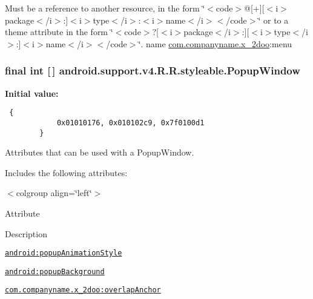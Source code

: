 Must be a reference to another resource, in the form \char`\"{}$<$code$>$@\mbox{[}+\mbox{]}\mbox{[}$<$i$>$package$<$/i$>$:\mbox{]}$<$i$>$type$<$/i$>$:$<$i$>$name$<$/i$>$$<$/code$>$\char`\"{} or to a theme attribute in the form \char`\"{}$<$code$>$?\mbox{[}$<$i$>$package$<$/i$>$:\mbox{]}\mbox{[}$<$i$>$type$<$/i$>$:\mbox{]}$<$i$>$name$<$/i$>$$<$/code$>$\char`\"{}.  name \hyperlink{namespacecom_1_1companyname_1_1x__2doo}{com.companyname.x\_\-2doo}:menu \hypertarget{classandroid_1_1support_1_1v4_1_1_r_1_1styleable_f2e6c1d44ab2f0d74ae025658a5ce5c3}{
\subsubsection[{PopupWindow}]{\setlength{\rightskip}{0pt plus 5cm}final int \mbox{[}$\,$\mbox{]} android.support.v4.R.R.styleable.PopupWindow}}
\label{classandroid_1_1support_1_1v4_1_1_r_1_1styleable_f2e6c1d44ab2f0d74ae025658a5ce5c3}


\textbf{Initial value:}

\begin{Code}\begin{verbatim} {
            0x01010176, 0x010102c9, 0x7f0100d1
        }
\end{verbatim}
\end{Code}
Attributes that can be used with a PopupWindow. 

Includes the following attributes: \begin{TabularC}{0}
\hline
\end{TabularC}
$<$colgroup align=\char`\"{}left\char`\"{}$>$ 

Attribute

Description 

{\tt \hyperlink{classandroid_1_1support_1_1v4_1_1_r_1_1styleable_f970662097b36e68ef64f2f8aac9faa6}{android:popupAnimationStyle}}

{\tt \hyperlink{classandroid_1_1support_1_1v4_1_1_r_1_1styleable_ffd6102b5b5902031d344f853fbe672f}{android:popupBackground}}

{\tt \hyperlink{classandroid_1_1support_1_1v4_1_1_r_1_1styleable_5bdcff06e514b36248013954ab1337cb}{com.companyname.x\_\-2doo:overlapAnchor}}

